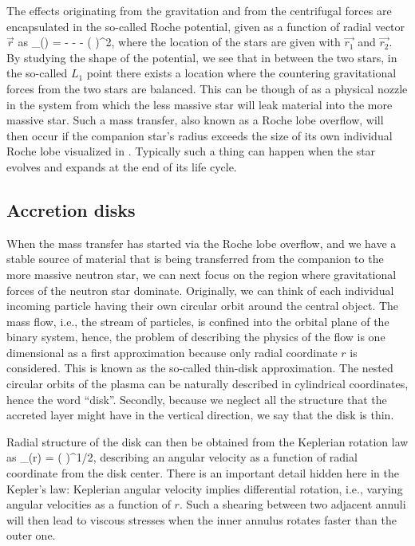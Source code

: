The effects originating from the gravitation and from the centrifugal forces are encapsulated in the so-called Roche potential, given as a function of radial vector $\vec{r}$ as\cite[see, e.g.,][]{PRP02, LL15}
\be
\Phi_{}() = - - -  ( \vec{ \omega } \times {} )^2,
\ee
where the location of the stars are given with $\vec{r_1}$ and $\vec{r_2}$.
By studying the shape of the potential, we see that in between the two stars, in the so-called $L_1$ point there exists a location where the countering gravitational forces from the two stars are balanced.
This can be though of as a physical nozzle in the system from which the less massive star will leak material into the more massive star.
Such a mass transfer, also known as a Roche lobe overflow, will then occur if the companion star's radius exceeds the size of its own individual Roche lobe visualized in .
Typically such a thing can happen when the star evolves and expands at the end of its life cycle. 


\subsection{Accretion disks}

When the mass transfer has started via the Roche lobe overflow, and we have a stable source of material that is being transferred from the companion to the more massive neutron star, we can next focus on the region where gravitational forces of the neutron star dominate.
Originally, we can think of each individual incoming particle having their own circular orbit around the central object.
The mass flow, i.e., the stream of particles, is confined into the orbital plane of the binary system, hence, the problem of describing the physics of the flow is one dimensional as a first approximation because only radial coordinate $r$ is considered.
This is known as the so-called thin-disk approximation.
The nested circular orbits of the plasma can be naturally described in cylindrical coordinates, hence the word ``disk''.
Secondly, because we neglect all the structure that the accreted layer might have in the vertical direction, we say that the disk is thin.

Radial structure of the disk can then be obtained from the Keplerian rotation law as
\be
\Omega_{}(r) = \left(  \right)^{1/2},
\ee
describing an angular velocity as a function of radial coordinate from the disk center.
There is an important detail hidden here in the Kepler's law:
Keplerian angular velocity implies differential rotation, i.e., varying angular velocities as a function of $r$.
Such a shearing between two adjacent annuli will then lead to viscous stresses when the inner annulus rotates faster than the outer one.

